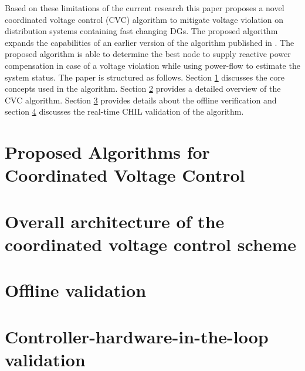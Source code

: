 \documentclass[Journal]{IEEEtran}
\begin{document}
Based on these limitations of the current research this paper proposes a novel coordinated voltage control (CVC) algorithm to mitigate voltage violation on distribution systems containing fast changing DGs. The proposed algorithm expands the capabilities of an earlier version of the algorithm published in \cite{cvc_conf}. The proposed algorithm is able to determine the best node to supply reactive power compensation in case of a voltage violation while using power-flow to estimate the system status. The paper is structured as follows. Section \ref{CU} discusses the core concepts used in the algorithm. Section \ref{CVC} provides a detailed overview of the CVC algorithm. Section \ref{off1} provides details about the offline verification and section \ref{chil} discusses the real-time CHIL validation of the algorithm.
\section{Proposed Algorithms for Coordinated Voltage Control}
\label{CU}


\section{Overall architecture of the coordinated voltage control scheme} \label{CVC}


\section{Offline validation}
\label{off1}


\section{Controller-hardware-in-the-loop validation}\label{chil}

\end{document}
